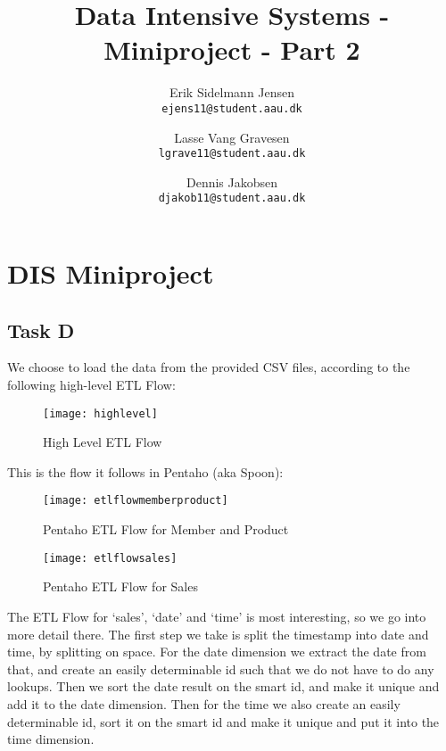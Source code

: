 

\author{
  Erik Sidelmann Jensen\\
  \texttt{ejens11@student.aau.dk}
  \and
  Lasse Vang Gravesen\\
  \texttt{lgrave11@student.aau.dk}
  \and
  Dennis Jakobsen\\
  \texttt{djakob11@student.aau.dk}  
}

\title{Data Intensive Systems - Miniproject - Part 2}
\date{}


	\clearpage\maketitle
	\thispagestyle{empty}
	
	\chapter{DIS Miniproject}
	\section{Task D}
    We choose to load the data from the provided CSV files, according to the following high-level ETL Flow:
    \begin{figure}[H]
    \begin{center}
    \texttt{[image: highlevel]}
    \caption{High Level ETL Flow}
    \label{fig:HighLevelETLFlow}
    \end{center}
    \end{figure}  
    
    This is the flow it follows in Pentaho (aka Spoon):
    
    \begin{figure}[H]
    \begin{center}
    \texttt{[image: etlflowmemberproduct]}
    \caption{Pentaho ETL Flow for Member and Product}
    \label{fig:PentahoETLFlowMemberAndProduct}
    \end{center}
    \end{figure}
    
    \begin{figure}[H]
    \begin{center}
    \texttt{[image: etlflowsales]}
    \caption{Pentaho ETL Flow for Sales}
    \label{fig:PentahoETLFlowSales}
    \end{center}
    \end{figure}
       
    The ETL Flow for `sales', `date' and `time' is most interesting, so we go into more detail there. The first step we take is split the timestamp into date and time, by splitting on space. For the date dimension we extract the date from that, and create an easily determinable id such that we do not have to do any lookups. Then we sort the date result on the smart id, and make it unique and add it to the date dimension. Then for the time we also create an easily determinable id, sort it on the smart id and make it unique and put it into the time dimension.
    
